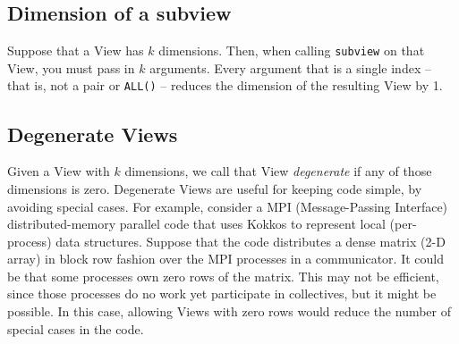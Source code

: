 \subsection{Dimension of a subview}\label{SS:Subviews:How:dim}

Suppose that a View has $k$ dimensions.  Then, when calling
\texttt{subview} on that View, you must pass in $k$ arguments.  Every
argument that is a single index -- that is, not a pair or
\lstinline!ALL()! -- reduces the dimension of the resulting View by 1.

\subsection{Degenerate Views}\label{SS:Subviews:How:degen}

Given a View with $k$ dimensions, we call that View \emph{degenerate}
if any of those dimensions is zero.  Degenerate Views are useful for
keeping code simple, by avoiding special cases.  For example, consider
a MPI (Message-Passing Interface) distributed-memory parallel code
that uses Kokkos to represent local (per-process) data structures.
Suppose that the code distributes a dense matrix (2-D array) in block
row fashion over the MPI processes in a communicator.  It could be
that some processes own zero rows of the matrix.  This may not be
efficient, since those processes do no work yet participate in
collectives, but it might be possible.  In this case, allowing Views
with zero rows would reduce the number of special cases in the code.
